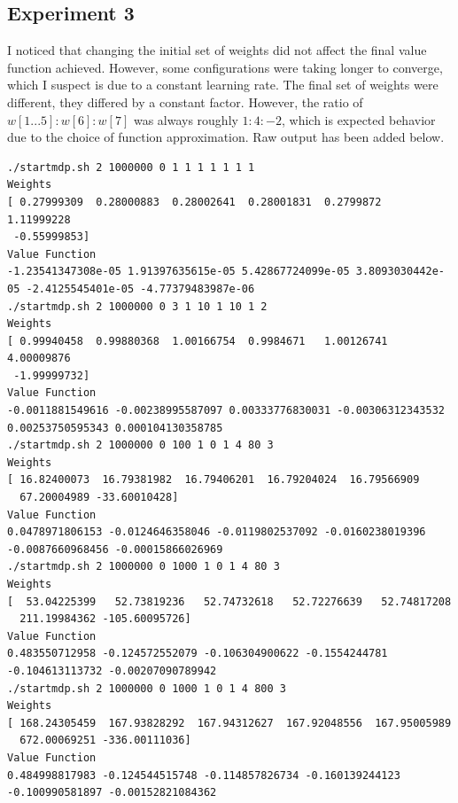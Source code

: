 \documentclass[11pt]{article}
\begin{document}
\subsection{Experiment 3}
I noticed that changing the initial set of weights did not affect the final value function achieved. However, some configurations were taking longer to converge, which I suspect is due to a constant learning rate. The final set of weights were different, they differed by a constant factor. However, the ratio of $w[1...5] : w[6] : w[7]$ was always roughly $1:4:-2$, which is expected behavior due to the choice of function approximation. Raw output has been added below. \\
\begin{verbatim}
./startmdp.sh 2 1000000 0 1 1 1 1 1 1 1
Weights
[ 0.27999309  0.28000883  0.28002641  0.28001831  0.2799872   1.11999228
 -0.55999853]
Value Function
-1.23541347308e-05 1.91397635615e-05 5.42867724099e-05 3.8093030442e-05 -2.4125545401e-05 -4.77379483987e-06
./startmdp.sh 2 1000000 0 3 1 10 1 10 1 2
Weights
[ 0.99940458  0.99880368  1.00166754  0.9984671   1.00126741  4.00009876
 -1.99999732]
Value Function
-0.0011881549616 -0.00238995587097 0.00333776830031 -0.00306312343532 0.00253750595343 0.000104130358785 
./startmdp.sh 2 1000000 0 100 1 0 1 4 80 3
Weights
[ 16.82400073  16.79381982  16.79406201  16.79204024  16.79566909
  67.20004989 -33.60010428]
Value Function
0.0478971806153 -0.0124646358046 -0.0119802537092 -0.0160238019396 -0.0087660968456 -0.00015866026969 
./startmdp.sh 2 1000000 0 1000 1 0 1 4 80 3
Weights
[  53.04225399   52.73819236   52.74732618   52.72276639   52.74817208
  211.19984362 -105.60095726]
Value Function
0.483550712958 -0.124572552079 -0.106304900622 -0.1554244781 -0.104613113732 -0.00207090789942 
./startmdp.sh 2 1000000 0 1000 1 0 1 4 800 3
Weights
[ 168.24305459  167.93828292  167.94312627  167.92048556  167.95005989
  672.00069251 -336.00111036]
Value Function
0.484998817983 -0.124544515748 -0.114857826734 -0.160139244123 -0.100990581897 -0.00152821084362
\end{verbatim}
\end{document}

